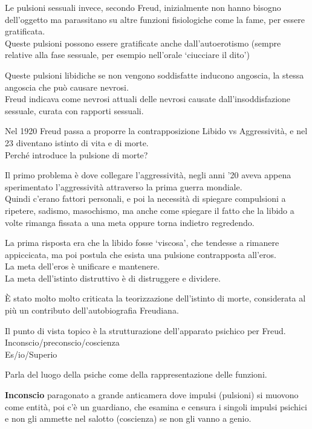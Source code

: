 \documentclass[
]{article}
\begin{document}
Le pulsioni sessuali invece, secondo Freud, inizialmente non hanno
bisogno dell'oggetto ma parassitano su altre funzioni fisiologiche come
la fame, per essere gratificata.\\
Queste pulsioni possono essere gratificate anche dall'autoerotismo
(sempre relative alla fase sessuale, per esempio nell'orale `ciucciare
il dito')

Queste pulsioni libidiche se non vengono soddisfatte inducono angoscia,
la stessa angoscia che può causare nevrosi.\\
Freud indicava come nevrosi attuali delle nevrosi causate
dall'insoddisfazione sessuale, curata con rapporti sessuali.

Nel 1920 Freud passa a proporre la contrapposizione Libido vs
Aggressività, e nel 23 diventano istinto di vita e di morte.\\
Perché introduce la pulsione di morte?

Il primo problema è dove collegare l'aggressività, negli anni '20 aveva
appena sperimentato l'aggressività attraverso la prima guerra
mondiale.\\
Quindi c'erano fattori personali, e poi la necessità di spiegare
compulsioni a ripetere, sadismo, masochismo, ma anche come spiegare il
fatto che la libido a volte rimanga fissata a una meta oppure torna
indietro regredendo.

La prima risposta era che la libido fosse `viscosa', che tendesse a
rimanere appiccicata, ma poi postula che esista una pulsione
contrapposta all'eros.\\
La meta dell'eros è unificare e mantenere.\\
La meta dell'istinto distruttivo è di distruggere e dividere.

È stato molto molto criticata la teorizzazione dell'istinto di morte,
considerata al più un contributo dell'autobiografia Freudiana.

Il punto di vista topico è la strutturazione dell'apparato psichico per
Freud.\\
Inconscio/preconscio/coscienza\\
Es/io/Superio

Parla del luogo della psiche come della rappresentazione delle funzioni.

\textbf{Inconscio} paragonato a grande anticamera dove impulsi
(pulsioni) si muovono come entità, poi c'è un guardiano, che esamina e
censura i singoli impulsi psichici e non gli ammette nel salotto
(coscienza) se non gli vanno a genio.
\end{document}
